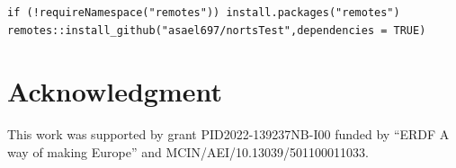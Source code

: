 \begin{verbatim}
if (!requireNamespace("remotes")) install.packages("remotes")
remotes::install_github("asael697/nortsTest",dependencies = TRUE)
\end{verbatim}

\section*{Acknowledgment}\label{acknowledgment}

This work was supported by grant PID2022-139237NB-I00 funded by ``ERDF A way of making Europe'' and MCIN/AEI/10.13039/501100011033.



\address{%
Asael Alonzo Matamoros\\
Aalto University\\%
Department of Computer Science\\ Eespo, Finland\\
%
\url{https://asael697.github.io}\\%
%
\href{mailto:izhar.alonzomatamoros@aalto.fi}{\nolinkurl{izhar.alonzomatamoros@aalto.fi}}%
}

\address{%
Alicia Nieto-Reyes\\
Universidad de Cantabria\\%
Departmento de Mathemáticas, Estadística y Computación\\ Avd. de los Castros s/n.~39005 Santander, Spain\\
%
\url{https://orcid.org/0000-0002-0268-3322}\\%
%
\href{mailto:alicia.nieto@unican.es}{\nolinkurl{alicia.nieto@unican.es}}%
}

\address{%
Claudio Agostinelli\\
University of Trento\\%
Department of Mathematics\\ Via Sommarive, 14 - 38123 Povo\\
%
\url{https://orcid.org/0000-0001-6702-4312}\\%
%
\href{mailto:claudio.agostinelli@unitn.it}{\nolinkurl{claudio.agostinelli@unitn.it}}%
}

